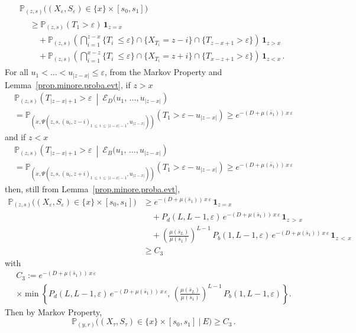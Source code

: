 \documentclass[10pt]{amsart}
\theoremstyle{definition}\newtheorem{defi}[theo]{Definition}\newtheorem{rema}[theo]{Remark}\newtheorem{exam}[theo]{Example}\newtheorem{exem}[theo]{Example}\newtheorem{nota}[theo]{Notation}
\newcommand{\PP}{\mathbb{P}}
\newcommand{\clE}{\mathcal{E}}
\newcommand{\barmu}{\mu(\bar s_1)}
\newcommand{\1}{\mathbf{1}}
\begin{document}
\begin{multline*}
\PP_{(z,s)}
\big((X_{\varepsilon},S_{\varepsilon})\in\{x\}\times [s_0,s_1]\big)
\\
\begin{aligned}
&\geq
\PP_{(z,s)}
\left(T_1>\varepsilon \right)\,\1_{z=x}
\\
&\quad + \PP_{(z,s)}
\left(\bigcap_{i=1}^{z-x}\{T_i\ \leq \varepsilon\} \cap \{ X_{T_i} = z-i \} \cap \{T_{z-x+1}>\varepsilon\}\right)\,\1_{z>x}
\\
&\quad +\PP_{(z,s)}
\left(\bigcap_{i=1}^{x-z}\{T_i\ \leq \varepsilon\} \cap \{ X_{T_i} = z+i \} \cap \{T_{x-z+1}>\varepsilon\}\right)\,\1_{z<x}\,.
\end{aligned}
\end{multline*}
For all $u_1<\dots < u_{|z-x|}\leq\varepsilon$, from the Markov Property and Lemma~\ref{prop.minore.proba.evt}, if $z>x$
\begin{multline*}
\PP_{(z,s)}\left(T_{|z-x|+1}>\varepsilon \ \middle|\ \clE_D(u_1,\,\dots,u_{|z-x|}\right) \\
= \PP_{(x,\Psi(z,s,(u_i,z-i)_{1\,\leq\,i\,\leq\,|z-x|-1},u_{|z-x|}))}\left(T_1>\varepsilon-u_{|z-x|}\right)
\geq e^{-(D+\barmu)\,x\,\varepsilon}
\end{multline*}
and if $z<x$
\begin{multline*}
\PP_{(z,s)}\left(T_{|z-x|+1}>\varepsilon \ \middle|\ \clE_B(u_1,\,\dots,u_{|z-x|}\right) \\
= \PP_{(x,\Psi(z,s,(u_i,z+i)_{1\,\leq\,i\,\leq\,|z-x|-1},u_{|z-x|}))}\left(T_1>\varepsilon-u_{|z-x|}\right)
\geq e^{-(D+\barmu)\,x\,\varepsilon}
\end{multline*}
then, still from Lemma~\ref{prop.minore.proba.evt},
\begin{align*}
\PP_{(z,s)}
\big((X_{\varepsilon},S_{\varepsilon})\in\{x\}\times [s_0,s_1]\big) & \geq e^{-(D+\barmu)\,x\,\varepsilon}\,\1_{z=x}
\\
& \quad + P_d(L, L-1,\varepsilon)\,e^{-(D+\barmu)\,x\,\varepsilon}\,\1_{z\,>\,x}
\\
& \quad +\left(\frac{\mu(\bar s_L)}{\barmu}\right)^{ L-1}\,P_b(1, L-1, \varepsilon)\, e^{-(D+\barmu)\,x\,\varepsilon}\,\1_{z\,<\,x}
\\
&\geq C_3
\end{align*}
with
\begin{multline*}
C_3:=e^{-(D+\barmu)\,x\,\varepsilon}\\
\times
\min\left\{P_d(L, L-1,\varepsilon)\,e^{-(D+\barmu)\,x\,\varepsilon},\,
\left(\frac{\mu(\bar s_L)}{\barmu}\right)^{ L-1}\,P_b(1, L-1, \varepsilon)\right\}.
\end{multline*}
Then by Markov Property,
\begin{equation}\label{lemma.reach.small.substrate.proba3}
\PP_{(y,r)}
\big((X_\tau,S_\tau)\in\{x\}\times [s_0,s_1] \ \big| \ E \big)
\geq C_3\,.
\end{equation}
\end{document}
